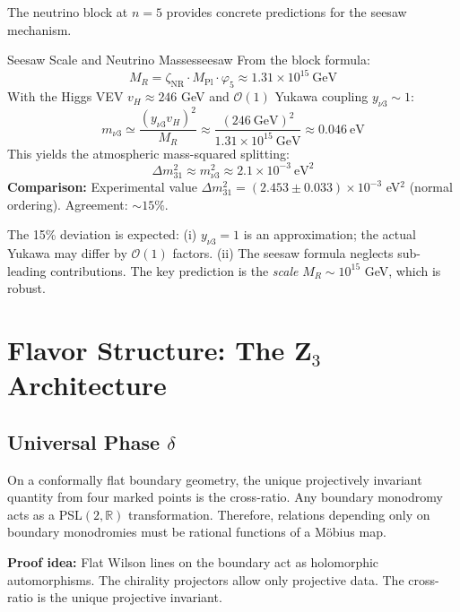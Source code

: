 The neutrino block at $n = 5$ provides concrete predictions for the seesaw mechanism.

\begin{corollary}{Seesaw Scale and Neutrino Masses}{seesaw}
From the block formula:
\begin{equation}
    M_R = \zeta_{\text{NR}} \cdot M_{\mathrm{Pl}} \cdot \varphi_5 
    \approx 1.31 \times 10^{15}~\text{GeV}
\end{equation}
With the Higgs VEV $v_H \approx 246$ GeV and $\mathcal{O}(1)$ Yukawa coupling $y_{\nu 3} \sim 1$:
\begin{equation}
    m_{\nu 3} \simeq \frac{(y_{\nu 3} v_H)^2}{M_R} 
    \approx \frac{(246~\text{GeV})^2}{1.31 \times 10^{15}~\text{GeV}} 
    \approx 0.046~\text{eV}
\end{equation}
This yields the atmospheric mass-squared splitting:
\begin{equation}
    \Delta m^2_{31} \approx m_{\nu 3}^2 \approx 2.1 \times 10^{-3}~\text{eV}^2
\end{equation}
\textbf{Comparison:} Experimental value $\Delta m^2_{31} = (2.453 \pm 0.033) \times 10^{-3}$ eV$^2$ 
(normal ordering). Agreement: $\sim 15\%$.
\end{corollary}

\begin{remark}
The 15\% deviation is expected: (i) $y_{\nu 3} = 1$ is an approximation; the 
actual Yukawa may differ by $\mathcal{O}(1)$ factors. (ii) The seesaw formula 
neglects sub-leading contributions. The key prediction is the \emph{scale} 
$M_R \sim 10^{15}$ GeV, which is robust.
\end{remark}

\section{Flavor Structure: The Z$_3$ Architecture}

\subsection{Universal Phase $\delta$}

\begin{tcolorbox}[colback=purple!3, colframe=purple!50!black, 
    title={\textbf{Lemma (Cross-Ratio from Boundary Monodromy)}}, fonttitle=\bfseries\small]
On a conformally flat boundary geometry, the unique projectively invariant quantity 
from four marked points is the cross-ratio. Any boundary monodromy acts as a 
PSL$(2,\mathbb{R})$ transformation. Therefore, relations depending only on boundary 
monodromies must be rational functions of a M\"obius map.

\textbf{Proof idea:} Flat Wilson lines on the boundary act as holomorphic automorphisms. 
The chirality projectors allow only projective data. The cross-ratio is the unique 
projective invariant.
\end{tcolorbox}

